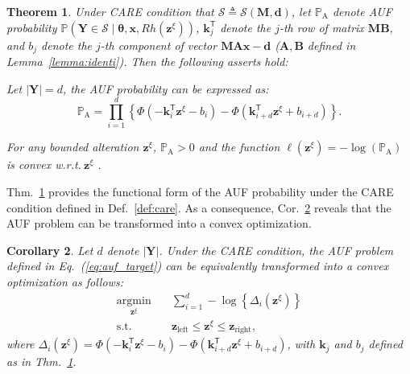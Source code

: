 \documentclass{article}
\theoremstyle{plain}
\newtheorem{theorem}{Theorem}[section]
\newtheorem{corollary}[theorem]{Corollary}
\theoremstyle{definition}
\def \x {\mathbf{x}}
\def \M {\mathbf{M}}
\def \A {\mathbf{A}}
\def \Y{\mathbf{Y}}
\def \wrt {\textit{w.r.t.}$\ $}
\def \Eq {Eq.}
\def \x {\mathbf{x}}
\def \sS {\mathcal{S}}
\def \Y {\mathbf{Y}}
\def \k {\mathbf{k}}
\def \M {\mathbf{M}}
\def \A {\mathbf{A}}
\def \B {\mathbf{B}}
\def \z {\mathbf{z}}
\def \d {\mathbf{d}}
\begin{document}
\begin{theorem}
  \label{thm:prob}
  Under CARE condition that $\sS\triangleq\sS(\M, \d)$, let $\mathbb{P}_{\operatorname*{A}}$ denote AUF probability $\mathbb{P}(\Y \in \sS \mid \bm{\theta}, \x, Rh(\z^\xi))$, $\k_j^\mathsf{T}$ denote the $j$-th row of matrix $\M\B$, and $b_j$ denote the $j$-th component of vector $\M\A\x-\d$ ($\A, \B$ defined in Lemma~\ref{lemma:identi}). Then the following asserts hold:
  \begin{compactenum}
    \item Let $|\Y|=d$, the AUF probability can be expressed as:
    \vspace{-0.1in}
    \begin{equation*}
      \label{eq:prob}
      \mathbb{P}_{\operatorname*{A}} = \prod_{i=1}^{d}\left\{\Phi\left(-\k_i^\mathsf{T} \z^\xi - b_i\right) - \Phi\left(\k^\mathsf{T}_{i+d} \z^\xi + b_{i+d}\right)\right\}.
    \end{equation*}
    \vspace{-0.1in}
    \item For any bounded alteration $\z^\xi$, $\mathbb{P}_{\operatorname*{A}}>0$ and the function $\ell\left(\z^\xi\right) = -\log\left(\mathbb{P}_{\operatorname*{A}}\right)$ is convex \wrt $\z^\xi$ .
  \end{compactenum}
\end{theorem}

Thm.~\ref{thm:prob} provides the functional form of the AUF probability under the CARE condition defined in Def.~\ref{def:care}. 
As a consequence, Cor.~\ref{corol:convex} reveals that the AUF problem can be transformed into a convex optimization.

\begin{corollary}
  \label{corol:convex}
  Let $d$ denote $|\Y|$. Under the CARE condition, the AUF problem defined in \Eq~(\ref{eq:auf_target}) can be equivalently transformed into a convex optimization as follows:
  \vspace*{-0.05in}
  \begin{equation}
    \label{eq:target_opt}
    \begin{aligned}
      \mathop{\arg\min}\limits_{\z^\xi}\quad &\sum_{i=1}^{d}-\log\left\{\Delta_i(\z^\xi)\right\}\\
      \operatorname*{s.t.}\quad & \z_{\operatorname*{left}} \leq \z^\xi \leq \z_{\operatorname*{right}},
    \end{aligned}
  \end{equation}
  where $\Delta_i(\z^\xi) = \Phi\left(-\k_i^\mathsf{T} \z^\xi - b_i\right) - \Phi\left(\k_{i+d}^\mathsf{T} \z^\xi + b_{i+d}\right)$, with $\k_j$ and $b_j$ defined as in Thm.~\ref{thm:prob}.
\end{corollary}
\end{document}
